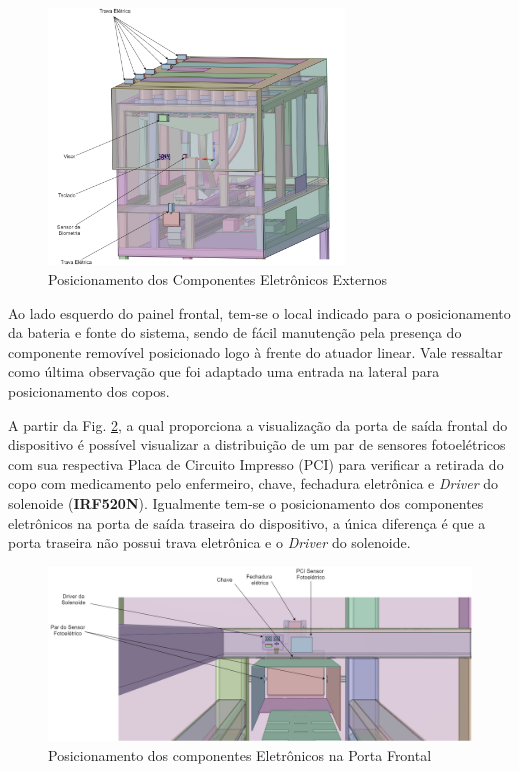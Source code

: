 \begin{figure}[H]
        \centering
        \includegraphics[width=0.70\textwidth]{figuras/integracao/Integracao_1.png}
        \caption{Posicionamento dos Componentes Eletrônicos Externos}
        \label{fig:Vista_componentes_externos}
    \end{figure}

Ao lado esquerdo do painel frontal, tem-se o local indicado para o posicionamento da bateria e fonte do sistema, sendo de fácil manutenção pela presença do componente removível posicionado logo à frente do atuador linear. Vale ressaltar como última observação que foi adaptado uma entrada na lateral para posicionamento dos copos.


 A partir da Fig. \ref{fig:Vista_componentes_porta}, a qual proporciona a visualização da porta de saída frontal do dispositivo é possível visualizar a distribuição de um par de  sensores fotoelétricos com sua respectiva Placa de Circuito Impresso (PCI) para verificar a retirada do copo com medicamento pelo enfermeiro, chave, fechadura eletrônica e \textit{Driver} do solenoide (\textbf{IRF520N}). Igualmente tem-se o posicionamento dos componentes eletrônicos na porta de saída traseira do dispositivo, a única diferença é que a porta traseira não possui trava eletrônica e o \textit{Driver} do solenoide.
 

\begin{figure}[H]
        \centering
        \includegraphics[width=\textwidth]{figuras/integracao/Integracao_2.png}
        \caption{Posicionamento dos componentes Eletrônicos na Porta Frontal}
        \label{fig:Vista_componentes_porta}
    \end{figure}
    
